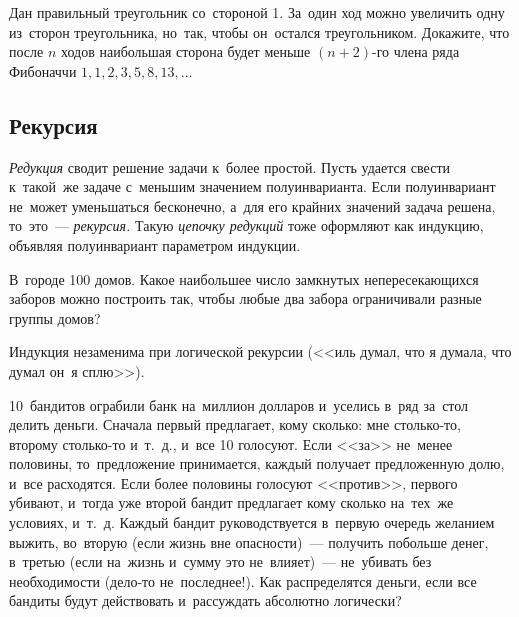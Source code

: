 \begin{problems}

\item
Дан правильный треугольник со~стороной 1.
За~один ход можно увеличить одну из~сторон треугольника, но~так, чтобы
он~остался треугольником.
Докажите, что после $n$ ходов наибольшая сторона будет меньше $(n + 2)$-го
члена ряда Фибоначчи $1, 1, 2, 3, 5, 8, 13, \ldots$

\end{problems}

\subsection*{Рекурсия}

\emph{Редукция} сводит решение задачи к~более простой.
Пусть удается свести к~такой~же задаче с~меньшим значением полуинварианта.
Если полуинвариант не~может уменьшаться бесконечно, а~для его крайних значений
задача решена, то~это~--- \emph{рекурсия.}
Такую \emph{цепочку редукций} тоже оформляют как индукцию, объявляя
полуинвариант параметром индукции.

\begin{problems}

\item
В~городе 100 домов.
Какое наибольшее число замкнутых непересекающихся заборов можно построить так,
чтобы любые два забора ограничивали разные группы домов?

\end{problems}

Индукция незаменима при логической рекурсии
(<<иль думал, что я думала, что думал он~я сплю>>).

\begin{problems}

\item
10~бандитов ограбили банк на~миллион долларов и~уселись в~ряд за~стол делить
деньги.
Сначала первый предлагает, кому сколько: мне столько-то, второму столько-то
и~т.~д., и~все 10 голосуют.
Если <<за>> не~менее половины, то~предложение принимается, каждый получает
предложенную долю, и~все расходятся.
Если более половины голосуют <<против>>, первого убивают, и~тогда уже второй
бандит предлагает кому сколько на~тех~же условиях, и~т.~д.
Каждый бандит руководствуется в~первую очередь желанием выжить, во~вторую
(если жизнь вне опасности)~--- получить побольше денег, в~третью
(если на~жизнь и~сумму это не~влияет)~--- не~убивать без необходимости
(дело-то не~последнее!).
Как распределятся деньги, если все бандиты будут действовать и~рассуждать
абсолютно логически?

\end{problems}

